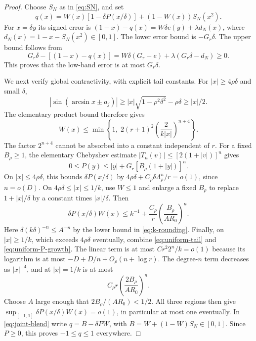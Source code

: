 \begin{proof}
Choose $S_N$ as in \eqref{eq:SN}, and set
\begin{equation}\label{eq:joint-blend}
 q(x)=W(x)[1-\delta P(x/\delta)]+(1-W(x))S_N(x^2).
\end{equation}
For $x=\delta y$ its signed error is
$(1-x)-q(x)=W\delta e(y)+\lambda d_N(x)$, where
$d_N(x)=1-x-S_N(x^2)\in[0,1]$. The lower error bound is $-G_r\delta$. The upper bound follows from
\[
 G_r\delta-[(1-x)-q(x)]
 =W\delta(G_r-e)+\lambda(G_r\delta-d_N)\geq0.
\]
This proves that the low-band error is at most $G_r\delta$.

We next verify global contractivity, with explicit tail constants. For $|x|\geq4\rho\delta$ and small $\delta$,
\[
 |\sin(\arcsin x\pm a_j)|
 \geq |x|\sqrt{1-\rho^2\delta^2}-\rho\delta\geq |x|/2.
\]
The elementary product bound therefore gives
\begin{equation}\label{eq:uniform-tail}
 W(x)\leq\min\left\{1,\;2(r+1)^2
                \left(\frac2{k|x|}\right)^{n+4}\right\}.
\end{equation}
The factor $2^{n+4}$ cannot be absorbed into a constant independent of $r$.
For a fixed $B_\rho\geq1$, the elementary Chebyshev estimate
$|T_n(v)|\leq[2(1+|v|)]^n$ gives
\begin{equation}\label{eq:uniform-P-growth}
 0\leq P(y)\leq |y|+G_r[B_\rho(1+|y|)]^n.
\end{equation}
On $|x|\leq4\rho\delta$, this bounds $\delta P(x/\delta)$ by
$4\rho\delta+C_\rho\delta\Lambda_\rho^n/r=o(1)$, since $n=o(D)$.
On $4\rho\delta\leq|x|\leq1/k$, use $W\leq1$ and enlarge a fixed $B_\rho$ to replace $1+|x|/\delta$ by a constant times $|x|/\delta$. Then
\[
 \delta P(x/\delta)W(x)
 \leq k^{-1}+\frac{C_\rho}{r}
                     \left(\frac{B_\rho}{AR_0}\right)^n.
\]
Here $\delta(k\delta)^{-n}\leq A^{-n}$ by the lower bound in \eqref{eq:k-rounding}. Finally, on $|x|\geq1/k$, which exceeds $4\rho\delta$ eventually, combine \eqref{eq:uniform-tail} and \eqref{eq:uniform-P-growth}. The linear term is at most $C r^2 2^n/k=o(1)$ because its logarithm is at most $-D+D/n+O_\rho(n+\log r)$. The degree-$n$ term decreases as $|x|^{-4}$, and at $|x|=1/k$ is at most
\[
 C_\rho r\left(\frac{2B_\rho}{AR_0}\right)^n.
\]
Choose $A$ large enough that $2B_\rho/(AR_0)<1/2$. All three regions then give $\sup_{[-1,1]}\delta P(x/\delta)W(x)=o(1)$, in particular at most one eventually. In \eqref{eq:joint-blend} write $q=B-\delta PW$, with $B=W+(1-W)S_N\in[0,1]$. Since $P\geq0$, this proves $-1\leq q\leq1$ everywhere.


\end{proof}
